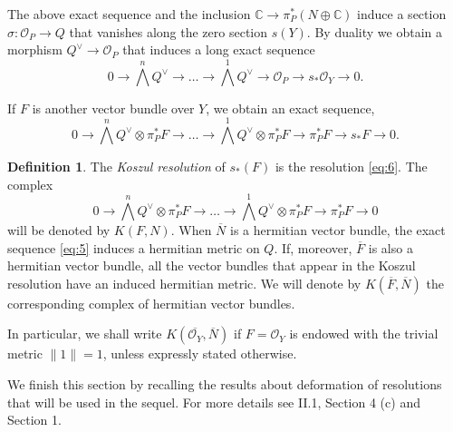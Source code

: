 \documentclass[10pt,twoside]{article}
\numberwithin{equation}{section}
\theoremstyle{plain}
\theoremstyle{definition}
\newtheorem{definition}[equation]{Definition}
\begin{document}
The above exact sequence and the inclusion $\mathbb{C}\longrightarrow
\pi _{P}^{\ast}(N\oplus \mathbb{C})$ induce a section $\sigma
\colon\mathcal{O}_{P}\longrightarrow Q$ that vanishes along the zero section
$s(Y)$. By duality we obtain a morphism $Q^{\vee}\longrightarrow
\mathcal{O}_{P}$ that induces a long exact sequence
\begin{displaymath}
  0\longrightarrow \bigwedge^{n}Q^{\vee}\longrightarrow \dots
  \longrightarrow  \bigwedge^{1} Q^{\vee}\longrightarrow
  \mathcal{O}_{P}\longrightarrow  s_{\ast}
  \mathcal{O}_{Y}\longrightarrow 0. 
\end{displaymath}

If $F$ is another vector bundle over $Y$, we obtain an exact
sequence,  
\begin{equation}
\label{eq:6}
  0\longrightarrow \bigwedge^{n}Q^{\vee}\otimes \pi
  _{P}^{\ast}F\longrightarrow \dots 
  \longrightarrow  \bigwedge^{1} Q^{\vee}\otimes \pi _{P}^{\ast}F\longrightarrow
  \pi _{P}^{\ast}F\longrightarrow  s_{\ast}
  F\longrightarrow 0. 
\end{equation}

\begin{definition} \label{def:2}
  The \emph{Koszul resolution} of $s_{\ast}(F)$ is the resolution
  \eqref{eq:6}. The complex
\begin{displaymath}
  0\longrightarrow \bigwedge^{n}Q^{\vee}\otimes \pi
  _{P}^{\ast}F\longrightarrow \dots 
  \longrightarrow  \bigwedge^{1} Q^{\vee}\otimes \pi _{P}^{\ast}F\longrightarrow
  \pi _{P}^{\ast}F\longrightarrow  0
\end{displaymath}
will be  denoted by $K(F,N)$. 
When $\overline N$ is a hermitian vector bundle, the exact sequence
\eqref{eq:5} 
induces a hermitian metric on $Q$. If, moreover, $\overline F$ is
also a hermitian
vector bundle, all the vector bundles that appear in the Koszul resolution
have an induced hermitian metric. We will denote by $K(\overline
F,\overline N)$ the corresponding complex of hermitian vector
bundles. 
\end{definition}

In particular, we shall write $K(\overline
{\mathcal{O}_Y},\overline N)$ if $F=\mathcal{O}_Y$ is endowed with
the trivial metric $\|1\|=1$, unless expressly stated otherwise.

We finish this section by recalling the results about deformation
of resolutions that will be used in the sequel. For more details see 
\cite{BaumFultonMacPherson:RRsv} II.1,
\cite{BismutGilletSoule:MR1086887} Section 4 (c) 
and \cite{GilletSoule:aRRt} Section 1.
\end{document}

